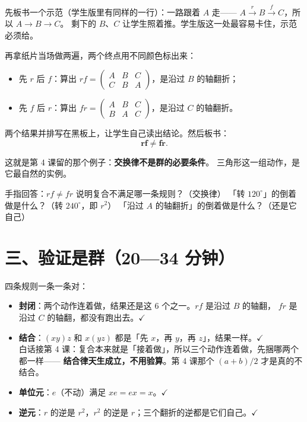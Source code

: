 \begin{caozuo}
  先板书一个示范（学生版里有同样的一行）：一路跟着 \(A\) 走——
  \(A\xrightarrow{\ r\ }B\xrightarrow{\ f\ }C\)，所以 \(A\to B\to C\)。
  剩下的 \(B\)、\(C\) 让学生照着推。学生版这一处最容易卡住，示范必须给。

  再拿纸片当场做两遍，两个终点用不同颜色标出来：
  \begin{itemize}
    \item 先 \(r\) 后 \(f\)：算出 \(rf=\begin{pmatrix}A&B&C\\C&B&A\end{pmatrix}\)，是沿过 \(B\) 的轴翻折；
    \item 先 \(f\) 后 \(r\)：算出 \(fr=\begin{pmatrix}A&B&C\\B&A&C\end{pmatrix}\)，是沿过 \(C\) 的轴翻折。
  \end{itemize}
  两个结果并排写在黑板上，让学生自己读出结论。然后板书：
  \[
    \mathbf{rf\neq fr} .
  \]
\end{caozuo}

\begin{zhu}
  这就是第 4 课留的那个例子：\textbf{交换律不是群的必要条件}。
  三角形这一组动作，是它最自然的实例。
\end{zhu}

\begin{caozuo}
  手指回答：\(rf\neq fr\) 说明复合不满足哪一条规则？（交换律）
  「转 \(120^\circ\)」的倒着做是什么？（转 \(240^\circ\)，即 \(r^2\)）
  「沿过 \(A\) 的轴翻折」的倒着做是什么？（还是它自己）
\end{caozuo}

\section*{三、验证是群（20—34 分钟）}

四条规则一条一条对：

\begin{itemize}
  \item \textbf{封闭}：两个动作连着做，结果还是这 \(6\) 个之一。\(rf\) 是沿过 \(B\) 的轴翻，
    \(fr\) 是沿过 \(C\) 的轴翻，都没有跑出去。\(\checkmark\)
  \item \textbf{结合}：\((xy)z\) 和 \(x(yz)\) 都是「先 \(x\)，再 \(y\)，再 \(z\)」，结果一样。\(\checkmark\)\\
    白话接第 4 课：复合本来就是「接着做」，所以三个动作连着做，先捆哪两个都一样——
    \textbf{结合律天生成立，不用验算}。第 4 课那个 \((a+b)/2\) 才是真的不结合。
  \item \textbf{单位元}：\(e\)（不动）满足 \(xe=ex=x\)。\(\checkmark\)
  \item \textbf{逆元}：\(r\) 的逆是 \(r^2\)，\(r^2\) 的逆是 \(r\)；三个翻折的逆都是它们自己。\(\checkmark\)
\end{itemize}

